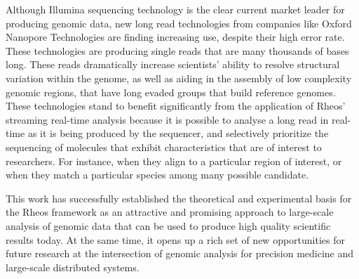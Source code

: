 Although Illumina sequencing technology is the clear current market leader for producing genomic data, new long read technologies from companies like Oxford Nanopore Technologies are finding increasing use, despite their high error rate\autocite{laver2015assessing}. These technologies are producing single reads that are many thousands of bases long. These reads dramatically increase scientists' ability to resolve structural variation within the genome\autocite{norris2016nanopore}, as well as aiding in the assembly of low complexity genomic regions, that have long evaded groups that build reference genomes\autocite{michael2018high}. These technologies stand to benefit significantly from the application of Rheos' streaming real-time analysis because it is possible to analyse a long read in real-time as it is being produced by the sequencer, and selectively prioritize the sequencing of molecules that exhibit characteristics that are of interest to researchers. For instance, when they align to a particular region of interest, or when they match a particular species among many possible candidate.

This work has successfully established the theoretical and experimental basis for the Rheos framework as an attractive and promising approach to large-scale analysis of genomic data that can be used to produce high quality scientific results today. At the same time, it opens up a rich set of new opportunities for future research at the intersection of genomic analysis for precision medicine and large-scale distributed systems.